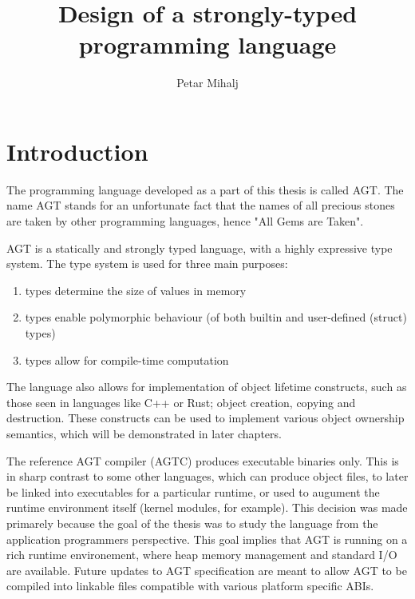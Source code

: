 \documentclass[times, utf8, diplomski]{fer}
\begin{document}

\title{Design of a strongly-typed programming language}

\author{Petar Mihalj}

\maketitle




\tableofcontents

\chapter{Introduction}

The programming language developed as a part of this thesis is called AGT.
The name AGT stands for an unfortunate fact that the names of all precious stones
are taken by other programming languages, hence "All Gems are Taken".

AGT is a statically and strongly typed language, with a highly expressive type system.
The type system is used for three main purposes:

\begin{enumerate}
    \item types determine the size of values in memory
    \item types enable polymorphic behaviour (of both builtin and user-defined (struct) types)
    \item types allow for compile-time computation
\end{enumerate}

The language also allows for implementation of object lifetime constructs, 
such as those seen in languages like C++ or Rust; object creation, copying and destruction.
These constructs can be used to implement various object ownership semantics, 
which will be demonstrated in later chapters.

The reference AGT compiler (AGTC) produces executable binaries only.
This is in sharp contrast to some other languages, which can produce object files, 
to later be linked into executables for a particular runtime, 
or used to augument the runtime environment itself (kernel modules, for example). 
This decision was made primarely because the goal of the thesis was to study the language 
from the application programmers perspective. 
This goal implies that AGT is running on a rich runtime environement, 
where heap memory management and standard I/O are available.
Future updates to AGT specification are meant to allow AGT to be compiled
into linkable files compatible with various platform specific ABIs.
\end{document}
